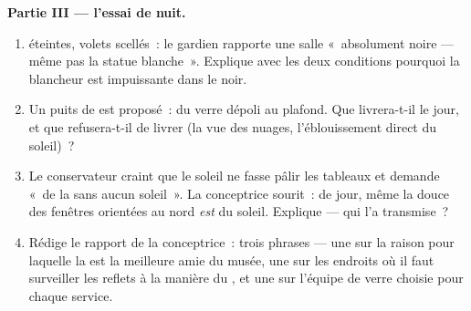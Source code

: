\begin{problem}
\medskip\noindent\textbf{Partie III --- l'essai de nuit.}
\begin{enumerate}[resume]
  \item {} éteintes, volets scellés~: le gardien rapporte une
        salle «~absolument noire --- même pas la statue blanche~».
        Explique avec les deux conditions pourquoi la blancheur est
        impuissante dans le noir.
  \item Un puits de  est proposé~: du verre dépoli au
        plafond. Que livrera-t-il le jour, et que refusera-t-il de
        livrer (la vue des nuages, l'éblouissement direct du
        soleil)~?
  \item Le conservateur craint que le soleil ne fasse pâlir les
        tableaux et demande «~de la  sans aucun soleil~». La
        conceptrice sourit~: de jour, même la douce  des
        fenêtres orientées au nord \emph{est} du soleil.
        Explique --- qui l'a transmise~?
  \item Rédige le rapport de la conceptrice~: trois phrases ---
        une sur la raison pour laquelle la  est la
        meilleure amie du musée, une sur les endroits où il faut
        surveiller les reflets à la manière du , et une sur
        l'équipe de verre choisie pour chaque service.
\end{enumerate}
\end{problem}
